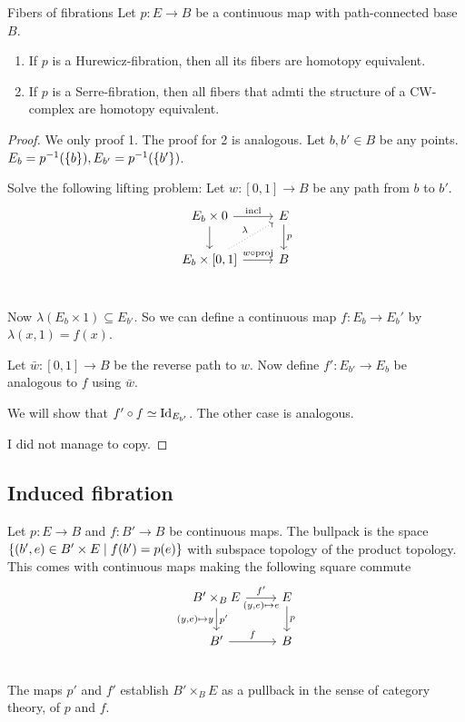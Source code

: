 \documentclass[language=english]{TemplateLecture}
\begin{document}
\begin{thm}{Fibers of fibrations}{}
    Let \(p \colon E \to B\) be a continuous map with path-connected base \(B\).
    \begin{enumerate}
        \item If \(p\) is a Hurewicz-fibration, then all its fibers are homotopy equivalent.
        \item If \(p\) is a Serre-fibration, then all fibers that admti the structure of a CW-complex are homotopy equivalent.
    \end{enumerate}
\end{thm}

\begin{proof}
    We only proof 1. The proof for 2 is analogous. Let \(b, b' \in B\) be any points. \(E_b = p^{-1}(\{b\}), E_{b'} = p^{-1}(\{b'\})\).

    Solve the following lifting problem: Let \(w\colon [0,1] \to B\) be any path from \(b\) to \(b'\).
    \[\begin{tikzcd}
        E_b\times 0 \ar[r, "\incl"] \ar[d] & E \ar[d, "p"] \\
        E_b \times [0,1] \ar[ru, "\lambda", dotted] \ar[r, "w \circ \mathrm{proj}"] & B \\
    \end{tikzcd}\]

    Now \(\lambda(E_b \times 1) \subseteq E_{b'}\). So we can define a continuous map \(f\colon E_b \to E_b'\) by \(\lambda(x,1) = f(x)\).

    Let \(\bar w\colon [0,1] \to B\) be the reverse path to \(w\). Now define \(f'\colon E_{b'} \to E_b\) be analogous to \(f\) using \(\bar w\).

    We will show that \(f'\circ f \simeq \operatorname{Id}_{E_{b'}}\). The other case is analogous.

    I did not manage to copy.
\end{proof}

\subsection{Induced fibration}

Let \(p \colon E \to B\) and \(f\colon B' \to B\) be continuous maps. The bullpack is the space \(\{(b',e) \in B' \times E \mid f(b') = p(e)\}\) with subspace topology of the product topology.
This comes with continuous maps making the following square commute
\[\begin{tikzcd}
    B'\times_B E \ar[r, "f'", "{(y,e)\mapsto e}"'] \ar[d, "p'", "{(y,e) \mapsto y}"'] & E \ar[d, "p"] \\
    B' \ar[r, "f"] & B \\
\end{tikzcd}\]
The maps \(p'\) and \(f'\) establish \(B' \times_B E\) as a pullback in the sense of category theory, of \(p\) and \(f\).
\end{document}
